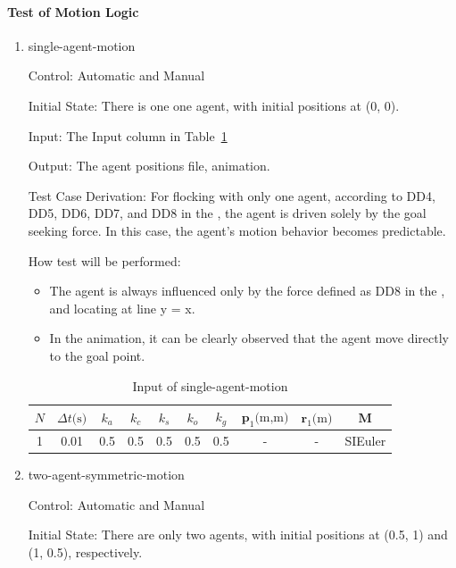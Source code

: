 \documentclass[12pt, titlepage]{article}
\begin{document}
\paragraph{Test of Motion Logic}

\begin{enumerate}

\item{single-agent-motion\\} \label{singleAgentTest}

Control: Automatic and Manual
					
Initial State: There is one one agent, with initial positions at (0, 0).
					
Input: The Input column in Table~\ref{TblMotionTest0}
					
Output: The agent positions file, animation.

Test Case Derivation: For flocking with only one agent, according to DD4, 
DD5, DD6, DD7, and DD8 in the \citet{SRS}, the agent is driven solely by the 
goal seeking force. In this case, the agent's motion behavior becomes predictable.

How test will be performed: 
\begin{itemize}
\item The agent is always influenced only by the force defined as DD8 in 
the \citet{SRS}, and locating at line y = x.
\item In the animation, it can be clearly observed that the agent move 
directly to the goal point.
\end{itemize}

\begin{longtable}{c c c c c c c c c c}
\caption{Input of single-agent-motion} \label{TblMotionTest0} \\
\hline
$N$ & ${\Delta t}\text{(s)}$ & $k_a$ & $k_c$ & $k_s$ & $k_o$ & $k_g$ & $\mathbf{p}_1\text{(m,m)}$ & $\mathbf{r}_1\text{(m)}$ & $\mathbf{M}$ \\
\hline
1 & 0.01 & 0.5 & 0.5 & 0.5 & 0.5 & 0.5 & - & - & SIEuler \\
\hline
\end{longtable}

\item{two-agent-symmetric-motion\\} \label{symmetricTest}

Control: Automatic and Manual
					
Initial State: There are only two agents, with initial positions at (0.5, 1) 
and (1, 0.5), respectively.
					

\end{enumerate}
\end{document}
